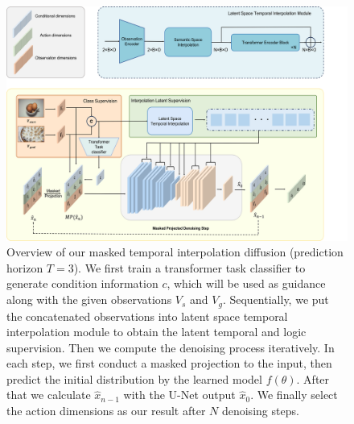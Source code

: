 \begin{figure}[ht]
\centering
\includegraphics[width=1.06\textwidth, height=0.39\textheight]{figures/architecture.png}
\caption{Overview of our masked temporal interpolation diffusion (prediction horizon $T=3$). We first train a transformer task classifier to generate condition information $c$, which will be used as guidance along with the given observations $V_s$ and $V_g$. Sequentially, we put the concatenated observations into latent space temporal interpolation module to obtain the latent temporal and logic supervision. Then we compute the denoising process iteratively. In each step, we first conduct a masked projection to the input, then predict the initial distribution by the learned model $f(\theta)$. After that we calculate $\hat{x}_{n-1}$ with the U-Net output $\hat{x}_0$. We finally select the action dimensions as our result after $N$ denoising steps. }
\label{fig:architecture}
\end{figure}
